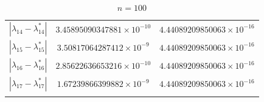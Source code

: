 \documentclass[UTF8,a4paper,10pt]{ctexart}
\begin{document}
\begin{table}[h!]
\begin{tabular}{ccc}
                $\left|\lambda_{14}-\lambda_{14}^*\right|$ & $3.45895090347881\times 10^{-10}$ & $4.44089209850063\times 10^{-16}$ \\
                $\left|\lambda_{15}-\lambda_{15}^*\right|$ & $3.50817064287412\times 10^{-9}$ & $4.44089209850063\times 10^{-16}$ \\
                $\left|\lambda_{16}-\lambda_{16}^*\right|$ & $2.85622636653216\times 10^{-10}$ & $4.44089209850063\times 10^{-16}$ \\
                $\left|\lambda_{17}-\lambda_{17}^*\right|$ & $1.67239866399882\times 10^{-9}$ & $4.44089209850063\times 10^{-16}$ \\
                \noalign{\smallskip}\hline
            \end{tabular}
            \caption{$n=100$}
        \end{table}
\end{document}
